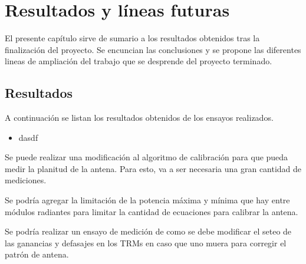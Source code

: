 \chapter{Resultados y líneas futuras}

El presente capítulo sirve de sumario a los resultados obtenidos tras la finalización del proyecto. Se encuncian las 
conclusiones y se propone las diferentes lineas de ampliación del trabajo que se desprende del proyecto terminado.

\section{Resultados}

A continuación se listan los resultados obtenidos de los ensayos realizados.
\begin{itemize}
	\item dasdf
\end{itemize}
Se puede realizar una modificación al algoritmo de calibración para que pueda medir la planitud de la antena. Para esto, va a ser
necesaria una gran cantidad de mediciones.

Se podría agregar la limitación de la potencia máxima y mínima que hay entre módulos radiantes para limitar la cantidad de 
ecuaciones para calibrar la antena.

Se podría realizar un ensayo de medición de como se debe modificar el seteo de las ganancias y defasajes en los TRMs en caso 
que uno muera para corregir el patrón de antena.
